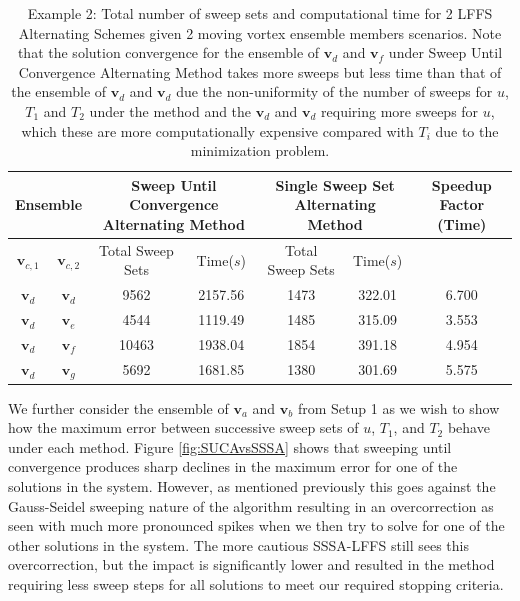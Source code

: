 \documentclass[pdflatex,sn-mathphys-num]{sn-jnl}%
\def \bv{{\mathbf {v}}}
\theoremstyle{thmstyleone}%
\theoremstyle{thmstyletwo}%
\theoremstyle{thmstylethree}%
\begin{document}
\begin{table}[h!]
    \centering
                \begin{tabular}{|c|c|c|c|c|c|c|} \hline 

                \multicolumn{2}{|c|}{Ensemble} &
                \multicolumn{2}{|p{3.7cm}|}{\centering Sweep Until Convergence Alternating Method}
                &
                \multicolumn{2}{|p{3.7cm}|}{\centering Single Sweep Set Alternating Method}&
                \multicolumn{1}{|p{2.2cm}|}{\centering Speedup Factor (Time)}\\ \hline

                $\bv_{c,1}$ & $\bv_{c,2}$ & Total Sweep Sets & Time($s$) & Total Sweep Sets & Time($s$) & \\ \hline

                $\bv_d$ & $\bv_d$ & 9562 & 2157.56 & 1473 & 322.01 & 6.700\\ \hline


                $\bv_d$ & $\bv_e$ & 4544 & 1119.49 & 1485 & 315.09 & 3.553\\ \hline

                $\bv_d$ & $\bv_f$ & 10463 & 1938.04 & 1854 & 391.18 & 4.954\\ \hline

                $\bv_d$ & $\bv_g$ & 5692 & 1681.85 & 1380 & 301.69 & 5.575\\ \hline

                 
                 
            \end{tabular}
    \caption{Example 2: Total number of sweep sets and computational time for 2 LFFS Alternating Schemes given 2 moving vortex ensemble members scenarios.  Note that the solution convergence for the ensemble of $\bv_d$ and $\bv_f$ under Sweep Until Convergence Alternating Method takes more sweeps but less time than that of the ensemble  of $\bv_d$ and $\bv_d$ due the non-uniformity of the number of sweeps for $u$, $T_1$ and $T_2$ under the method and the $\bv_d$ and $\bv_d$ requiring more sweeps for $u$, which these are more computationally expensive compared with $T_i$ due to the minimization problem.}
    \label{tab:2b}
\end{table}



We further consider the ensemble of $\bv_a$ and $\bv_b$ from Setup 1 as we wish to show how the maximum error between successive sweep sets of $u$, $T_1$, and $T_2$ behave under each method.  Figure \ref{fig:SUCAvsSSSA} shows that sweeping until convergence produces sharp declines in the maximum error for one of the solutions in the system.  However, as mentioned previously this goes against the Gauss-Seidel sweeping nature of the algorithm resulting in an overcorrection as seen with much more pronounced spikes when we then try to solve for one of the other solutions in the system.  The more cautious SSSA-LFFS still sees this overcorrection, but the impact is significantly lower and resulted in the method requiring less sweep steps for all solutions to meet our required stopping criteria.
\end{document}

